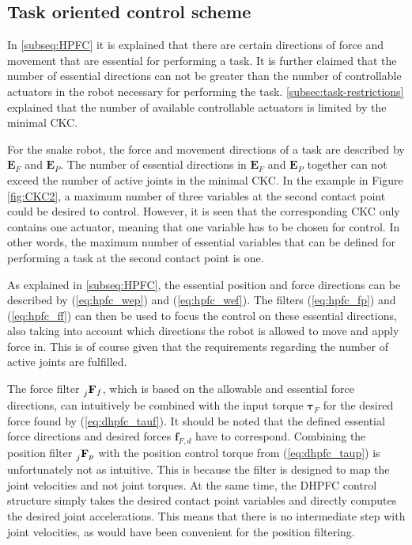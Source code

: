 \subsection{Task oriented control scheme}\label{subsec:task-oriented}


In \ref{subseq:HPFC} it is explained that there are certain directions of force and movement that are essential for performing a task. It is further claimed that the number of essential directions can not be greater than the number of controllable actuators in the robot necessary for performing the task. \ref{subsec:task-restrictions} explained that the number of available controllable actuators is limited by the minimal CKC.

For the snake robot, the force and movement directions of a task are described by $\mathbf{E}_F$ and $\mathbf{E}_P$.
The number of essential directions in $\mathbf{E}_F$ and $\mathbf{E}_P$ together can not exceed the number of active joints in the minimal CKC. In the example in Figure \ref{fig:CKC2}, a maximum number of three variables at the second contact point could be desired to control. However, it is seen that the corresponding CKC only contains one actuator, meaning that one variable has to be chosen for control. In other words, the maximum number of essential variables that can be defined for performing a task at the second contact point is one.

As explained in \ref{subseq:HPFC}, the essential position and force directions can be described by (\ref{eq:hpfc_wep}) and (\ref{eq:hpfc_wef}). The filters (\ref{eq:hpfc_fp}) and (\ref{eq:hpfc_ff}) can then be used to focus the control on these essential directions, also taking into account which directions the robot is allowed to move and apply force in. This is of course given that the requirements regarding the number of active joints are fulfilled.

The force filter $\prescript{}{j}{\mathbf{F}}_{f}$, which is based on the allowable and essential force directions, can intuitively be combined with the input torque $\boldsymbol{\tau}_F$ for the desired force found by (\ref{eq:dhpfc_tauf}). It should be noted that the defined essential force directions and desired forces $\mathbf{f}_{F,d}$ have to correspond. Combining the position filter $\prescript{}{j}{\mathbf{F}}_{p}$ with the position control torque from (\ref{eq:dhpfc_taup}) is unfortunately not as intuitive. This is because the filter is designed to map the joint velocities and not joint torques. At the same time, the DHPFC control structure simply takes the desired contact point variables and directly computes the desired joint accelerations. This means that there is no intermediate step with joint velocities, as would have been convenient for the position filtering.

